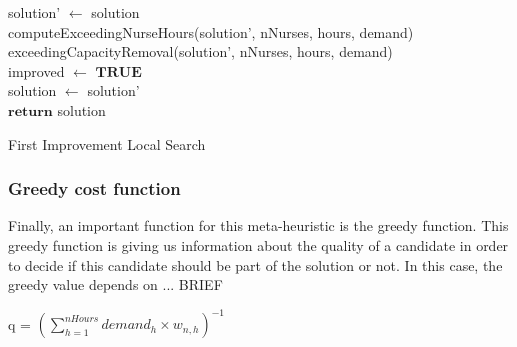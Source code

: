 \begin{algorithm}[H]

solution' $\leftarrow$ solution \\
computeExceedingNurseHours(solution', nNurses, hours, demand) \\
exceedingCapacityRemoval(solution', nNurses, hours, demand) \\
improved $\leftarrow$ $\textbf{TRUE}$ \\
solution $\leftarrow$ solution'\\
$\textbf{return}$ solution
\caption{First Improvement Local Search}\label{alg.mainLoop}
\end{algorithm}

\subsubsection{Greedy cost function}

Finally, an important function for this meta-heuristic is the greedy function. This greedy function is giving us information about the quality of a candidate in order to decide if this candidate should
be part of the solution or not. In this case, the greedy value depends on ... BRIEF

\begin{center}
q = $(\sum_{h=1}^{nHours} demand_h \times w_{n,h})^{-1}$
\end{center}

\pagebreak